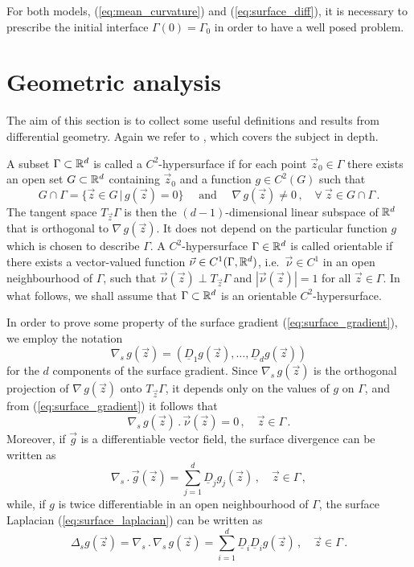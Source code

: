 For both models, (\ref{eq:mean_curvature}) and (\ref{eq:surface_diff}), it is
necessary to prescribe the initial interface $\Gamma(0)=\Gamma_0$ in order to
have a well posed problem.

\section{Geometric analysis}\label{sec:geometric_analysis}
The aim of this section is to collect some useful definitions and results from
differential geometry. Again we refer to \cite{DeckelnickDE05}, which covers the
subject in depth.

A subset $\Gamma \subset \mathbb R^d$ is called a $C^2$-hypersurface if for each point
$\vec z_0 \in \Gamma$ there exists an open set $G \subset \mathbb R^d$ containing
$\vec z_0$ and a function $g \in C^2(G)$ such that
\begin{equation}
G \cap \Gamma = \{ \vec z \in G \, | \, g(\vec z) = 0 \}
\quad \mbox{ and } \quad \nabla \, g(\vec z) \neq 0\,,
\quad \forall\ \vec z \in G \cap \Gamma \, .
\end{equation}
The tangent space $T_{\vec z} \Gamma$ is then the $(d-1)$-dimensional linear
subspace of $\mathbb R^d$ that is orthogonal to $\nabla \, g(\vec z)$. It does not
depend on the particular function $g$ which is chosen to describe $\Gamma$. A
$C^2$-hypersurface $\Gamma \in \mathbb R^d$ is called orientable if there exists a
vector-valued function $\vec\nu \in C^1(\Gamma, \mathbb R^d)$, i.e.~$\vec\nu \in C^1$
in an open neighbourhood of $\Gamma$, such that $\vec\nu(\vec z) \perp T_{\vec
z} \Gamma$ and $|\vec \nu(\vec z)| = 1$ for all $\vec z \in \Gamma$. In what
follows, we shall assume that $\Gamma \subset \mathbb R^d$ is an orientable
$C^2$-hypersurface.

In order to prove some property of the surface gradient
(\ref{eq:surface_gradient}), we employ the notation
\begin{equation}
\nabla_s \, g(\vec z) = (\underline{D}_1 g(\vec z), \hdots, \underline{D}_{d}
g(\vec z))
\end{equation}
for the $d$ components of the surface gradient. Since $\nabla_s \, g(\vec z)$
is the orthogonal projection of $\nabla \, g(\vec z)$ onto $T_{\vec z} \Gamma$,
it depends only on the values of $g$ on $\Gamma$, and from
(\ref{eq:surface_gradient}) it follows that
\begin{equation}\label{eq:surface_gradient_comp}
\nabla_s \, g(\vec z) \,.\, \vec \nu(\vec z)=0\,, \quad \vec z \in \Gamma\,.
\end{equation}
Moreover, if $\vec g$ is a differentiable vector field, the surface divergence
can be written as
\begin{equation}
\nabla_s \,.\, \vec g(\vec z) = \sum_{j = 1}^d \underline{D}_j g_j (\vec z)\,,
\quad \vec z \in \Gamma\,,
\end{equation}
while, if $g$ is twice differentiable in an open neighbourhood of
$\Gamma$, the surface Laplacian (\ref{eq:surface_laplacian}) can be written as
\begin{equation}\label{eq:surface_laplacian_comp}
\Delta_s g(\vec z) = \nabla_s\, . \,\nabla_s \, g(\vec z) =
\sum_{i = 1}^d \underline{D}_i \underline{D}_i g(\vec z) \, ,
\quad \vec z \in \Gamma \,.
\end{equation}

